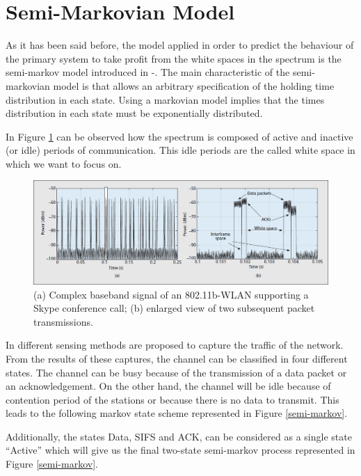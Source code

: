 \section{Semi-Markovian Model}
As it has been said before, the model applied in order to predict the behaviour of the primary system to take profit from the white spaces in the spectrum is the semi-markov model introduced in \cite{gts1}-\cite{gts3}. The main characteristic of the semi-markovian model is that allows an arbitrary specification of the holding time distribution in each state. Using a markovian model implies that the times distribution in each state must be exponentially distributed.

In Figure \ref{figure1spectrum} can be observed how the spectrum is composed of active and inactive (or idle) periods of communication. This idle periods are the called white space in which we want to focus on.

\begin{figure}[H]
\centering
\includegraphics[width=\linewidth]{images/spectrum}
\caption{(a) Complex baseband signal of an 802.11b-WLAN supporting a Skype conference call; (b) enlarged view of two subsequent packet transmissions. \cite{gts4}}
\label{figure1spectrum}
\end{figure}

In \cite{gts1} different sensing methods are proposed to capture the traffic of the network. From the results of these captures, the channel can be classified in four different states. The channel can be busy because of the transmission of a data packet or an acknowledgement. On the other hand, the channel will be idle because of contention period of the stations or because there is no data to transmit. This leads to the following markov state scheme represented in Figure \ref{semi-markov}.

Additionally, the states Data, SIFS and ACK, can be considered as a single state ``Active'' which will give us the final two-state semi-markov process represented in Figure \ref{semi-markov}.

